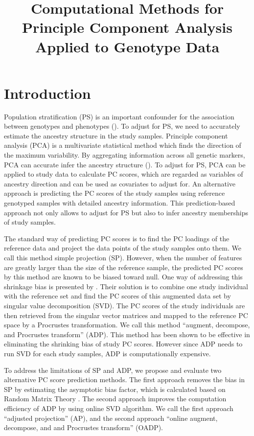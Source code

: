 \documentclass{article}
\title{Computational Methods for Principle Component Analysis Applied to
  Genotype Data}
\date{}
\begin{document}
\maketitle

\section{Introduction}

Population stratification (PS) is an important confounder for the association  between
genotypes and phenotypes (\cite{price}). To adjust for PS, we need to accurately estimate the ancestry structure in the study samples. Principle component analysis (PCA) is a multivariate statistical method which finds the direction of the maximum variability. By aggregating information across all genetic markers, PCA can accurate infer the ancestry structure  (\cite{reich}). To adjust for PS, PCA can be applied to study data to calculate PC scores, which are regarded as variables of ancestry direction and can be used as covariates to adjust for. An alternative approach is predicting the PC scores of the study samples using reference genotyped samples with detailed ancestry information.
This prediction-based approach not only allows to adjust for PS but also to infer ancestry memberships of study samples. 

The standard way of predicting PC scores is to find the PC loadings of the reference data and project the data points of the study samples onto them.
We call this method simple projection (SP).
However, when the number of features are greatly larger than the size of the reference sample,
the predicted PC scores by this method are known to be biased toward null.
One way of addressing this shrinkage bias is presented by \cite{wang}.
Their solution is to combine one study individual with the reference set and
find the PC scores of this augmented data set by singular value decomposition (SVD).
The PC scores of the study individuals are then retrieved from the singular vector matrices and mapped to the reference PC space by a Procrustes transformation.
We call this method ``augment, decompose, and Procrustes transform'' (ADP).
This method has been shown to be effective in eliminating the shrinking bias of
study PC scores.
However since ADP needs to run SVD for each study samples, ADP is computationally expensive.

To address the limitations of SP and ADP,
we propose and evaluate two alternative PC score prediction methods.
The first approach removes the bias in SP by estimating the asymptotic bias factor,
which is calculated based on Random Matrix Theory \cite{dey}.
The second approach improves the computation efficiency of ADP by using online SVD algorithm. 
We call the first approach ``adjusted projection'' (AP), and the second approach ``online augment, decompose, and and Procrustes transform'' (OADP). 
\end{document}
